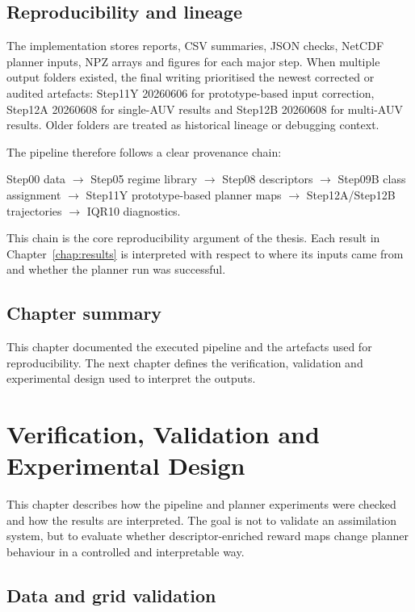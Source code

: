 \section{Reproducibility and lineage}

The implementation stores reports, CSV summaries, JSON checks, NetCDF planner inputs, NPZ arrays and figures for each major step. When multiple output folders existed, the final writing prioritised the newest corrected or audited artefacts: Step11Y 20260606 for prototype-based input correction, Step12A 20260608 for single-AUV results and Step12B 20260608 for multi-AUV results. Older folders are treated as historical lineage or debugging context.

The pipeline therefore follows a clear provenance chain:

\begin{center}
\small
Step00 data $\rightarrow$ Step05 regime library $\rightarrow$ Step08 descriptors $\rightarrow$ Step09B class assignment $\rightarrow$ Step11Y prototype-based planner maps $\rightarrow$ Step12A/Step12B trajectories $\rightarrow$ IQR10 diagnostics.
\end{center}

This chain is the core reproducibility argument of the thesis. Each result in Chapter~\ref{chap:results} is interpreted with respect to where its inputs came from and whether the planner run was successful.

\section{Chapter summary}

This chapter documented the executed pipeline and the artefacts used for reproducibility. The next chapter defines the verification, validation and experimental design used to interpret the outputs.


\chapter{Verification, Validation and Experimental Design} \label{chap:validation}

This chapter describes how the pipeline and planner experiments were checked and how the results are interpreted. The goal is not to validate an assimilation system, but to evaluate whether descriptor-enriched reward maps change planner behaviour in a controlled and interpretable way.

\section{Data and grid validation}

